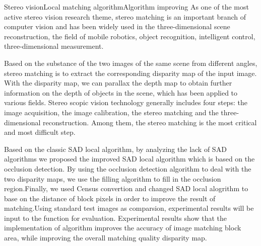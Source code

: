 
\begin{Eabstract}{Stereo vision}{Local matching algorithm}{Algorithm improving}{}{}
As  one  of  the  most 
active stereo vision research theme,  stereo  matching  is an important  branch  of  computer  vision  and has been widely used in the three-dimensional 
scene reconstruction, the field of mobile robotics, object recognition, intelligent control, 
three-dimensional measurement. 

Based on the substance of the two images of the same scene from different angles, 
stereo matching is to extract the corresponding disparity map of the input image. With 
the disparity map, we can parallax the depth map to obtain further information on the 
depth  of  objects  in  the  scene,  which  has  been  applied  to  various  fields.  Stereo  scopic 
vision  technology  generally  includes  four  steps:  the  image  acquisition,  the  image 
calibration, the stereo matching and the three-dimensional reconstruction. Among them, 
the  stereo  matching  is  the  most  critical  and  most  difficult  step.  

Based  on  the  classic SAD local  algorithm,  by  analyzing  the  lack  of  SAD 
algorithms we proposed the improved SAD local algorithm which is based on the  
occlusion  detection. By using the occlusion detection algorithm to  deal with the two disparity 
maps, we use the filling algorithm to fill in the occlusion region.Finally, we used Census convertion 
and changed SAD local alogrithm to base on the distance of block pixels in order to improve the result of matching.Using standard test images 
 as comparsion, experimental results will be input to the 
function for evaluation. Experimental results show that the implementation of algorithm improves the 
accuracy of image matching block  area, while improving the overall matching quality 
disparity map. 
\end{Eabstract}
